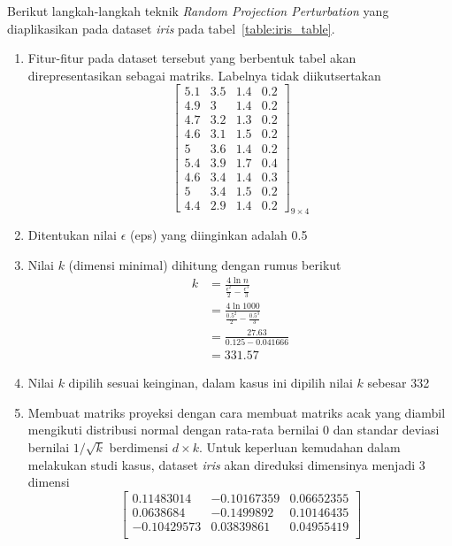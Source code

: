 \documentclass[a4paper,twoside]{article}
\begin{document}
\begin{enumerate}
		Berikut langkah-langkah teknik \textit{Random Projection Perturbation} yang diaplikasikan pada dataset \textit{iris} pada tabel~\ref{table:iris_table}.
		\begin{enumerate}
			\item Fitur-fitur pada dataset tersebut yang berbentuk tabel akan direpresentasikan sebagai matriks. Labelnya tidak diikutsertakan
			\[
				\begin{bmatrix}
				5.1		&		3.5		&		1.4		&		0.2	\\
				4.9		&		3		&		1.4		&		0.2	\\
				4.7		&		3.2		&		1.3		&		0.2	\\
				4.6		&		3.1		&		1.5		&		0.2	\\
				5		&		3.6		&		1.4		&		0.2	\\
				5.4		&		3.9		&		1.7		&		0.4	\\
				4.6		&		3.4		&		1.4		&		0.3	\\
				5		&		3.4		&		1.5		&		0.2	\\
				4.4		&		2.9		&		1.4		&		0.2 
				\end{bmatrix}_{9\times 4}
			\]
			\item Ditentukan nilai \(\epsilon\) (eps) yang diinginkan adalah 0.5
			\item Nilai \(k\) (dimensi minimal) dihitung dengan rumus berikut
			\begin{align*}
				k &= \frac{4\ln{n}}{\frac{\epsilon^{2}}{2}-\frac{\epsilon^{3}}{3}} \\
				&= \frac{4\ln{1000}}{\frac{0.5^{2}}{2}-\frac{0.5^{3}}{3}} \\
				&= \frac{27.63}{0.125-0.041666} \\
				&= 331.57
			\end{align*}
			\item Nilai \(k\) dipilih sesuai keinginan, dalam kasus ini dipilih nilai \(k\) sebesar 332
			\item Membuat matriks proyeksi dengan cara membuat matriks acak yang diambil mengikuti distribusi normal dengan rata-rata bernilai 0 dan standar deviasi bernilai \(1/\sqrt{k}\) berdimensi \(d \times k\). Untuk keperluan kemudahan dalam melakukan studi kasus, dataset \textit{iris} akan direduksi dimensinya menjadi 3 dimensi
			\[
				\begin{bmatrix}
				0.11483014 &  -0.10167359  &  0.06652355 \\
				0.0638684 &   -0.1499892   &  0.10146435 \\
				-0.10429573 &   0.03839861 &   0.04955419 \\

\end{bmatrix}\]
\end{enumerate}
\end{enumerate}
\end{document}
